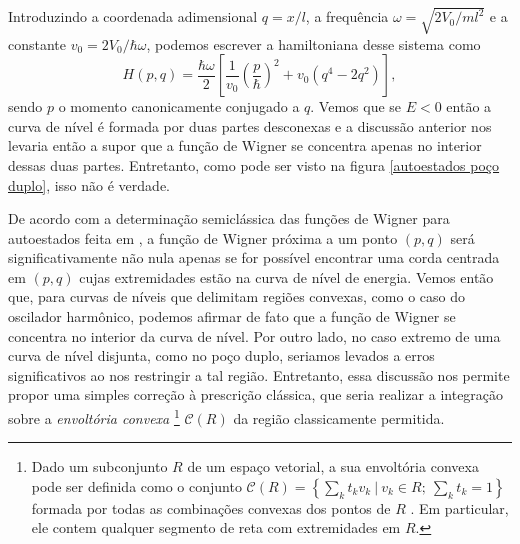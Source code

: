 \documentclass[
	12pt,
	oneside,			%
	a4paper,			%
	english,			%
	brazil				%
	]{abntex2}
\theoremstyle{definition}
\begin{document}
Introduzindo a coordenada adimensional $q = x/l$, a frequência $\omega = \sqrt{2V_0/ml^2}$ e a constante $v_0 = 2V_0/\hbar \omega$, podemos escrever a hamiltoniana desse sistema como
\begin{equation}
    H(p,q) = \frac{\hbar \omega}{2} \left[ \frac{1}{v_0} \left( \frac{p}{\hbar}\right)^2 + v_0\left( q^4-2q^2\right) \right],
\end{equation}
sendo $p$ o momento canonicamente conjugado a $q$. Vemos que se $E < 0$ então a curva de nível é formada por duas partes desconexas e a discussão anterior nos levaria então a supor que a função de Wigner se concentra apenas no interior dessas duas partes. Entretanto, como pode ser visto na figura \ref{autoestados poço duplo}, isso não é verdade.

De acordo com a determinação semiclássica das funções de Wigner para autoestados feita em \cite{berry1977semi}, a função de Wigner próxima a um ponto $(p,q)$ será significativamente não nula apenas se for possível encontrar uma corda centrada em $(p,q)$ cujas extremidades estão na curva de nível de energia. Vemos então que, para curvas de níveis que delimitam regiões convexas, como o caso do oscilador harmônico, podemos afirmar de fato que a função de Wigner se concentra no interior da curva de nível. Por outro lado, no caso extremo de uma curva de nível disjunta, como no poço duplo, seriamos levados a erros significativos ao nos restringir a tal região. Entretanto, essa discussão nos permite propor uma simples correção à prescrição clássica, que seria realizar a integração sobre a \textit{envoltória convexa} \footnote{Dado um subconjunto $R$ de um espaço vetorial, a sua envoltória convexa pode ser definida como o conjunto $\mathcal{C}(R) = \left\{ \sum_k t_k v_k \ | \ v_k \in R ; \ \sum_k t_k = 1 \right\}$ formada por todas as combinações convexas dos pontos de $R$ \cite{lima2016algebra}. Em particular, ele contem qualquer segmento de reta com extremidades em $R$.} $\mathcal{C}(R)$ da região classicamente permitida.
\end{document}
